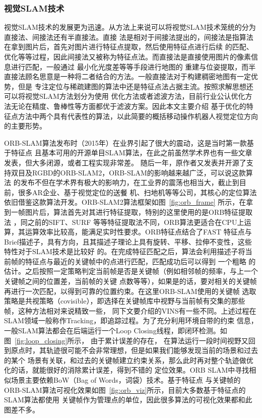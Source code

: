 \subsubsection{视觉SLAM技术}

视觉SLAM技术的发展更为迅速。从方法上来说可以将视觉SLAM技术笼统的分为直接法、间接法还有半直接法。直接
法是相对于间接法提出的，间接法是指算法在拿到图片后，首先对图片进行特征点提取，然后使用特征点进行后续
的匹配、优化等等过程，因此间接法又被称为特征点法。而直接法是直接使用图片的像素信息进行匹配，一般通过
最小化光度差等等手段进行地图的
重建与位姿提取，而半直接法顾名思意是一种将二者结合的方法。一般直接法对于构建稠密地图有一定优势，但是
专注定位与稀疏建图的算法中还是特征点法占据主流。按照求解思想还可以将视觉SLAM方法划分为使用
优化方法或者滤波方法，目前行业公认优化方法无论在精度、鲁棒性等方面都优于滤波方案。因此本文主要介绍
基于优化的特征点方法中两个具有代表性的算法，以此简要的概括移动操作机器人视觉定位方向的主要形势。

ORB-SLAM算法\cite{mur2015orb}发布时（2015年）在业界引起了很大的震动，这是当时第一款基于特征点
且基本可用的开源单目SLAM算法，在此之前虽然学术界也有一些文章发表，但大多闭源，或者工程实现非常差。
随后一年，原作者又发表并开源了支持双目及RGBD的ORB-SLAM2，ORB-SLAM的影响越来越广泛，可以说这款算法
的发布不但在学术界有极大的影响力，在工业界的震荡也相当大，截止到目前，很多AR企业、基于视觉定位的送餐
机、扫地机等等公司，其核心的定位算法依旧借鉴这款算法开发。ORB-SLAM2算法框架如图~\ref{fig:orb_frame}
所示，在拿到一帧图片后，算法首先对其进行特征提取，特别的这里使用的是ORB特征提取法\cite{rublee2011orb}
，同之前的SIFT、SURF
等等特征提取法不同，ORB算法更适合在CPU上运算，其运算效率比较高，能满足实时性要求。ORB特征点结合了FAST
特征点与Brief描述子，具有方向，且其描述子理论上具有旋转、平移、拉伸不变性，这些特性对于SLAM技术是比较好
的。在完成特征匹配之后，算法会利用描述子将当前帧的特征点与最近的关键帧中的点进行匹配，匹配成功后可以得到
一个粗略
的估计。之后按照一定策略判定当前帧是否是关键帧（例如相邻帧的频率，与上一个关键帧之间的位置差，当前帧的关键
点数等等），如果是的话，要对相关的关键帧再进行一次匹配，以得到可靠的位置约束。在这里ORB-SLAM使用的关键帧
选取策略是共视策略（covisible），即选择在关键帧库中视野与当前帧有交集的那些帧，这种方法相对来说精致一些，
同下文要介绍的VINS有一些不同。上述过程在SLAM领域一般称作Tracking，即追踪过程。为了充分利用环境自带的约束
信息，一般SLAM算法都会在后端运行一个Loop Closing线程，即闭环检测。如图~\ref{fig:loop_closing}所示，
由于累计误差的存在，
在算法运行一段时间视野又回到原点时，其轨迹很可能不会非常理想，但是如果我们能够发现当前的场景和过去的某个
场景有关联，和过去的关键帧建立约束关系，那么此时再对整个轨迹做优化的话，就能很好的消除累计误差，得到不错的
定位效果。ORB SLAM中寻找相似场景主要依赖BoW（Bag of Words，词袋）技术\cite{GalvezTRO12}。基于特征点
与关键帧的ORB-SLAM算法可视化效果如图~\ref{fig:orb_viz}所示，目前大多数基于特征点的SLAM算法都使用
关键帧作为管理点的单位，因此很多算法的可视化效果都和此图差不多。


